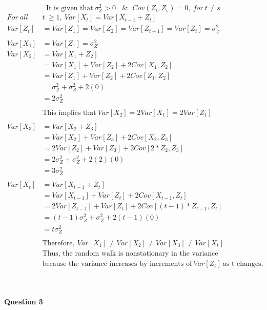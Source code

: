 \documentclass[
]{article}
\begin{document}
\[ \text{It is given that}\ σ_{Z}^2>0\  \ \ \ \& \ \ \ Cov(Z_{t}, Z_{s}) =0,\ for\ t \ne s\]
\[ 
\begin{aligned}
For\ all\ &t\ \ge 1,\ Var[X_{t}] = Var[X_{t-1} + Z_{t}]\\
Var[Z_{t}] & = Var[Z_{1}] = Var[Z_{2}] = Var[Z_{t-1}] = Var[Z_{t}] =  \sigma^2_{Z} \\ \\
Var[X_{1}]& = Var[Z_{1}] = \sigma^2_{Z}\\
Var[X_{2}]& = Var[X_{1} + Z_{2}] \\
&= Var[X_{1}] + Var[Z_{2}] + 2Cov[X_{1}, Z_{2}]\\
&= Var[Z_{1}] + Var[Z_{2}] + 2Cov[Z_{1}, Z_{2}]\\
&= \sigma^2_{Z} + \sigma^2_{Z} + 2(0)\\
&= 2\sigma^2_{Z} \\ \\
& \text{This implies that}\ Var[X_{2}] = 2Var[X_{1}] = 2Var[Z_{1}]\\ \\
Var[X_{3}]& = Var[X_{2} + Z_{3}] \\
&= Var[X_{2}] + Var[Z_{3}] + 2Cov[X_{2}, Z_{3}]\\
&= 2Var[Z_{2}] + Var[Z_{3}] + 2Cov[2*Z_{2}, Z_{3}]\\
&= 2\sigma^2_{Z} + \sigma^2_{Z} + 2(2)(0)\\
&= 3\sigma^2_{Z} \\ \\
Var[X_{t}]& = Var[X_{t-1} + Z_{t}] \\
&= Var[X_{t-1}] + Var[Z_{t}] + 2Cov[X_{t-1}, Z_{t}]\\
&= 2Var[Z_{t-1}] + Var[Z_{t}] + 2Cov[(t-1)*Z_{t-1}, Z_{t}]\\
&= (t-1)\sigma^2_{Z} + \sigma^2_{Z} + 2(t-1)(0)\\
&= t\sigma^2_{Z} \\ \\
& \text{Therefore},\ Var[X_{1}] \ne Var[X_{2}] \ne Var[X_{3}] \ne Var[X_{t}]\\
& \text{Thus, the random walk is nonstationary in the variance}\\
& \text{because the variance increases by increments of}\ Var[Z_{t}]\ \text{as t changes}.
\end{aligned} 
\]

\setlength{\leftskip}{0cm}\\

\hypertarget{question-3}{%
\paragraph{Question 3}\label{question-3}}
\end{document}
